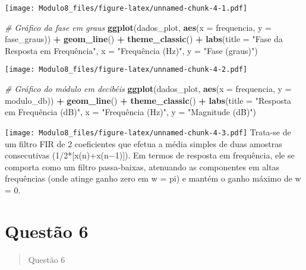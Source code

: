 \documentclass[
]{article}
\newenvironment{Shaded}{\begin{snugshade}}{\end{snugshade}}
\newcommand{\AttributeTok}[1]{\textcolor[rgb]{0.13,0.29,0.53}{#1}}
\newcommand{\CommentTok}[1]{\textcolor[rgb]{0.56,0.35,0.01}{\textit{#1}}}
\newcommand{\FunctionTok}[1]{\textcolor[rgb]{0.13,0.29,0.53}{\textbf{#1}}}
\newcommand{\NormalTok}[1]{#1}
\newcommand{\SpecialCharTok}[1]{\textcolor[rgb]{0.81,0.36,0.00}{\textbf{#1}}}
\newcommand{\StringTok}[1]{\textcolor[rgb]{0.31,0.60,0.02}{#1}}
\begin{document}
\texttt{[image: Modulo8\_files/figure-latex/unnamed-chunk-4-1.pdf]}

\begin{Shaded}
\begin{Highlighting}[]
\CommentTok{\# Gráfico da fase em graus}
\FunctionTok{ggplot}\NormalTok{(dados\_plot, }\FunctionTok{aes}\NormalTok{(}\AttributeTok{x =}\NormalTok{ frequencia, }\AttributeTok{y =}\NormalTok{ fase\_graus)) }\SpecialCharTok{+}
  \FunctionTok{geom\_line}\NormalTok{() }\SpecialCharTok{+}
  \FunctionTok{theme\_classic}\NormalTok{() }\SpecialCharTok{+}
  \FunctionTok{labs}\NormalTok{(}\AttributeTok{title =} \StringTok{"Fase da Resposta em Frequência"}\NormalTok{, }\AttributeTok{x =} \StringTok{"Frequência (Hz)"}\NormalTok{, }\AttributeTok{y =} \StringTok{"Fase (graus)"}\NormalTok{)}
\end{Highlighting}
\end{Shaded}

\texttt{[image: Modulo8\_files/figure-latex/unnamed-chunk-4-2.pdf]}

\begin{Shaded}
\begin{Highlighting}[]
\CommentTok{\# Gráfico do módulo em decibéis}
\FunctionTok{ggplot}\NormalTok{(dados\_plot, }\FunctionTok{aes}\NormalTok{(}\AttributeTok{x =}\NormalTok{ frequencia, }\AttributeTok{y =}\NormalTok{ modulo\_db)) }\SpecialCharTok{+}
  \FunctionTok{geom\_line}\NormalTok{() }\SpecialCharTok{+}
  \FunctionTok{theme\_classic}\NormalTok{() }\SpecialCharTok{+}
  \FunctionTok{labs}\NormalTok{(}\AttributeTok{title =} \StringTok{"Resposta em Frequência (dB)"}\NormalTok{, }\AttributeTok{x =} \StringTok{"Frequência (Hz)"}\NormalTok{, }\AttributeTok{y =} \StringTok{"Magnitude (dB)"}\NormalTok{)}
\end{Highlighting}
\end{Shaded}

\texttt{[image: Modulo8\_files/figure-latex/unnamed-chunk-4-3.pdf]}
Trata-se de um filtro FIR de 2 coeficientes que efetua a média simples
de duas amostras consecutivas (1/2*{[}x(n)+x(n−1){]}). Em termos de
resposta em frequência, ele se comporta como um filtro passa-baixas,
atenuando as componentes em altas frequências (onde atinge ganho zero em
w = pi) e mantém o ganho máximo de w = 0.

\newpage
\section*{Questão 6}

\begin{quote}
Questão 6
\end{quote}
\end{document}
